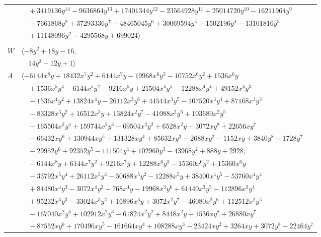 \documentclass[11pt]{article}
\begin{document}
\begin{longtable}{@{}ll@{}}
 & $\quad +3419136y^{14}-9636864y^{13}+17401344y^{12}-23564928y^{11}+25014720y^{10}-16211964y^{9}$\\
 & $\quad -7661868y^{8}+37293336y^{7}-48465045y^{6}+30069594y^{5}-1502196y^{4}-13101816y^{3}$\\
 & $\quad +11148096y^{2}-4295568y+699024\rangle$\\
\addlinespace[2pt]
\multicolumn{2}{@{}p{0.97\textwidth}@{}}{$i=47$, $D_i=8$, $\rho_{ij}$: $0{:}1, \allowbreak 22{:}2, \allowbreak 30{:}2, \allowbreak 35{:}1, \allowbreak 38{:}1, \allowbreak 44{:}2, \allowbreak 54{:}1, \allowbreak 59{:}1$}\\
$W$ & $\langle -8y^{2}+18y-16,$\\
 & $\quad 14y^{2}-12y+1\rangle$\\
$A$ & $\langle -6144x^{8}y+18432x^{7}y^{2}+6144x^{7}y-19968x^{6}y^{3}-10752x^{6}y^{2}+1536x^{6}y$\\
 & $\quad +1536x^{5}y^{4}-6144x^{5}y^{2}-9216x^{5}y+21504x^{4}y^{5}-12288x^{4}y^{4}+49152x^{4}y^{3}$\\
 & $\quad -1536x^{4}y^{2}+13824x^{4}y-26112x^{3}y^{6}+44544x^{3}y^{5}-107520x^{3}y^{4}+87168x^{3}y^{3}$\\
 & $\quad -83328x^{3}y^{2}+16512x^{3}y+13824x^{2}y^{7}-41088x^{2}y^{6}+103680x^{2}y^{5}$\\
 & $\quad -165504x^{2}y^{4}+159744x^{2}y^{3}-69504x^{2}y^{2}+6528x^{2}y-3072xy^{8}+22656xy^{7}$\\
 & $\quad -66432xy^{6}+130944xy^{5}-131328xy^{4}+85632xy^{3}-2688xy^{2}-1152xy+3840y^{8}-1728y^{7}$\\
 & $\quad -29952y^{6}+92352y^{5}-141504y^{4}+102960y^{3}-43968y^{2}+888y+2928,$\\
 & $\quad -6144x^{8}y+6144x^{7}y^{2}+9216x^{7}y+12288x^{6}y^{3}-15360x^{6}y^{2}+15360x^{6}y$\\
 & $\quad -33792x^{5}y^{4}+26112x^{5}y^{3}-50688x^{5}y^{2}-12288x^{5}y+38400x^{4}y^{5}-53760x^{4}y^{4}$\\
 & $\quad +84480x^{4}y^{3}-3072x^{4}y^{2}-768x^{4}y-19968x^{3}y^{6}+61440x^{3}y^{5}-112896x^{3}y^{4}$\\
 & $\quad +95232x^{3}y^{3}-33024x^{3}y^{2}+16896x^{3}y+3072x^{2}y^{7}-46080x^{2}y^{6}+112512x^{2}y^{5}$\\
 & $\quad -167040x^{2}y^{4}+102912x^{2}y^{3}-61824x^{2}y^{2}+8448x^{2}y+1536xy^{8}+26880xy^{7}$\\
 & $\quad -87552xy^{6}+170496xy^{5}-161664xy^{4}+108288xy^{3}-23424xy^{2}+3264xy+3072y^{8}-22464y^{7}$\\

\end{longtable}
\end{document}
